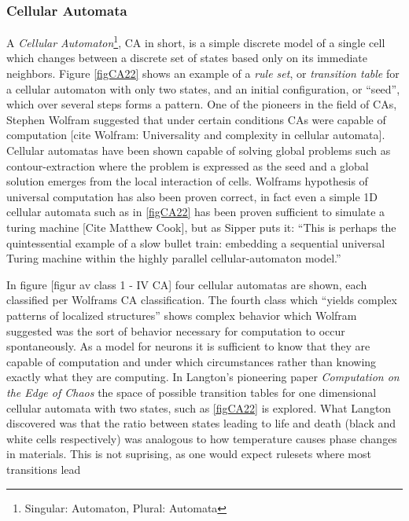 \subsubsection{Cellular Automata}
A \emph{Cellular Automaton}\footnote{Singular: Automaton, Plural: Automata}, CA
in short, is a simple discrete model of a single cell which changes between a
discrete set of states based only on its immediate neighbors.
Figure \ref{figCA22} shows an example of a \emph{rule set}, or \emph{transition
  table} for a cellular automaton with only two states, and an initial
configuration, or ``seed'', which over several steps forms a pattern.
%
One of the pioneers in the field of CAs, Stephen Wolfram suggested that under
certain conditions CAs were capable of computation [cite Wolfram: Universality
and complexity in cellular automata].
%
Cellular automatas have been shown capable of solving global problems such as
contour-extraction \cite{sipper_emergence_1999} where the problem is expressed
as the seed and a global solution emerges from the local interaction of cells.
Wolframs hypothesis of universal computation has also been proven correct, in
fact even a simple 1D cellular automata such as in \ref{figCA22} has been proven
sufficient to simulate a turing machine [Cite Matthew Cook],
but as Sipper puts it: ``This is perhaps the quintessential example of a slow
bullet train: embedding a sequential universal Turing machine within the
highly parallel cellular-automaton model.''\par
% 
%
In figure [figur av class 1 - IV CA] four cellular automatas are shown,
each classified per Wolframs CA classification.
The fourth class which ``yields complex patterns of localized
structures'' shows complex behavior which Wolfram suggested was the sort of
behavior necessary for computation to occur spontaneously.
%
As a model for neurons it is sufficient to know that they are capable of
computation and under which circumstances rather than knowing exactly what they
are computing.
%
In Langton's pioneering paper \emph{Computation on the Edge of Chaos}
\cite{langton_computation_1990} the space of possible transition tables for one
dimensional cellular automata with two states, such as \ref{figCA22} is explored.
What Langton discovered was that the ratio between states leading to life and
death (black and white cells respectively) was analogous to how temperature
causes phase changes in materials.
This is not suprising, as one would expect rulesets where most transitions lead
